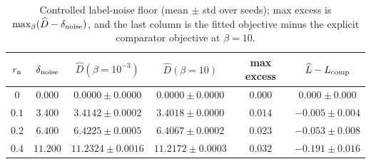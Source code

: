 \begin{table}[t]
\centering
\small
\setlength{\tabcolsep}{4pt}
\caption{Controlled label-noise floor (mean $\pm$ std over seeds); max excess is $\max_\beta(\widehat D-\delta_{\rm noise})$, and the last column is the fitted objective minus the explicit comparator objective at $\beta=10$.}
\label{tab:controlled-noisy-alignment}
\begin{tabular}{c c c c c c}
\hline
$r_{\rm n}$ & $\delta_{\rm noise}$ & $\widehat D(\beta{=}10^{-3})$ & $\widehat D(\beta{=}10)$ & max excess & $\widehat L-L_{\rm comp}$ \\
\hline
$0$ & $0.000$ & $0.0000\pm0.0000$ & $0.0000\pm0.0000$ & $0.000$ & $0.000\pm0.000$ \\
$0.1$ & $3.400$ & $3.4142\pm0.0002$ & $3.4018\pm0.0000$ & $0.014$ & $-0.005\pm0.004$ \\
$0.2$ & $6.400$ & $6.4225\pm0.0005$ & $6.4067\pm0.0002$ & $0.023$ & $-0.053\pm0.008$ \\
$0.4$ & $11.200$ & $11.2324\pm0.0016$ & $11.2172\pm0.0003$ & $0.032$ & $-0.191\pm0.016$ \\
\hline
\end{tabular}
\end{table}
